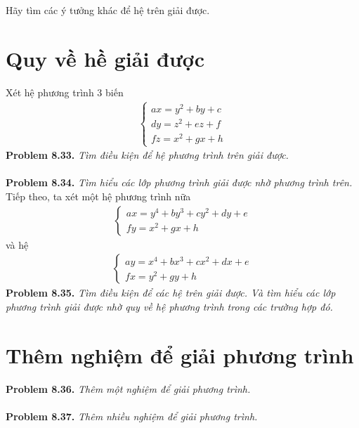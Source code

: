 \documentclass[a4paper,oneside]{book}
\numberwithin{equation}{chapter}
\begin{document}
Hãy tìm các ý tưởng khác để hệ trên giải được.
\section{Quy về hề giải được}
Xét hệ phương trình 3 biến
\begin{align}
\left\{ {\begin{array}{*{20}{c}}
{ax = {y^2} + by + c}\\
{dy = {z^2} + ez + f}\\
{fz = {x^2} + gx + h}
\end{array}} \right.
\end{align}
\textbf{Problem 8.33.} \textit{Tìm điều kiện để hệ phương trình trên giải được.}\\
\\
\textbf{Problem 8.34.} \textit{Tìm hiểu các lớp phương trình giải được nhờ phương trình trên.}\\

Tiếp theo, ta xét một hệ phương trình nữa
\begin{align}
\left\{ {\begin{array}{*{20}{c}}
{ax = {y^4} + b{y^3} + c{y^2} + dy + e}\\
{fy = {x^2} + gx + h}
\end{array}} \right.
\end{align}
và hệ
\begin{align}
\left\{ {\begin{array}{*{20}{c}}
{ay = {x^4} + b{x^3} + c{x^2} + dx + e}\\
{fx = {y^2} + gy + h}
\end{array}} \right.
\end{align}
\textbf{Problem 8.35.} \textit{Tìm điều kiện để các hệ trên giải được. Và tìm hiểu các lớp phương trình giải được nhờ quy về hệ phương trình trong các trường hợp đó.}
\section{Thêm nghiệm để giải phương trình}
\textbf{Problem 8.36.} \textit{Thêm một nghiệm để giải phương trình.}\\
\\
\textbf{Problem 8.37.} \textit{Thêm nhiều nghiệm để giải phương trình.}
\end{document}
